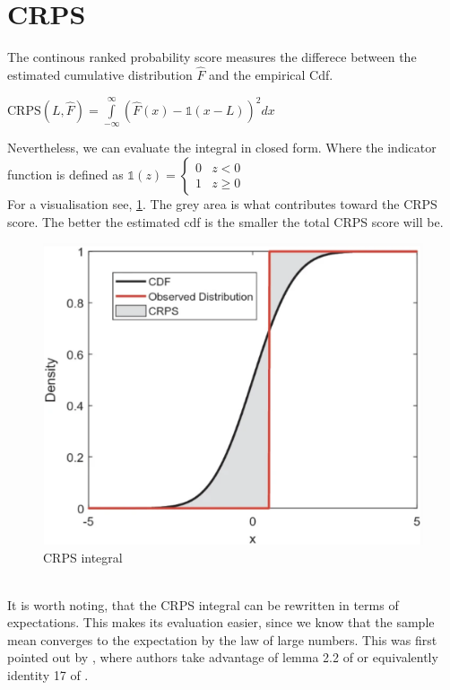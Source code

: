 \section{CRPS}
The continous ranked probability score measures the differece between the estimated cumulative distribution $\hat{F}$ and the empirical Cdf.
\begin{definition}\label{def_crps}
    $\mathrm{CRPS}(L, \hat{F})=\int\limits_{-\infty}^{\infty}\left(\hat{F}(x)-\mathbb{1}(x-L) \right)^2 dx$
\end{definition}
Nevertheless, we can evaluate the integral in closed form. 
Where the indicator function is defined as 
    $\mathbb{1}(z)=
\begin{cases}
0 & z<0\\
1 & z \geq 0
\end{cases}$
\\
For a visualisation see, \ref{fig:crps}. The grey area is what contributes toward the CRPS score.
The better the estimated cdf is the smaller the total CRPS score will be.
\begin{figure}
    \includegraphics[width=\textwidth]{images/crps.png}
    \caption{CRPS integral \cite{haben2023core}}
    \label{fig:crps}
  \end{figure}
  \\
It is worth noting, that the CRPS integral can be rewritten in terms of expectations. This makes its evaluation easier, since we know that the sample mean converges to the expectation by the law of large numbers. This was first pointed out by \cite{proper_scores}, where authors take advantage of lemma 2.2 of \cite{new_multi_test2} or equivalently identity 17 of \cite{new_multi_tes1}.
